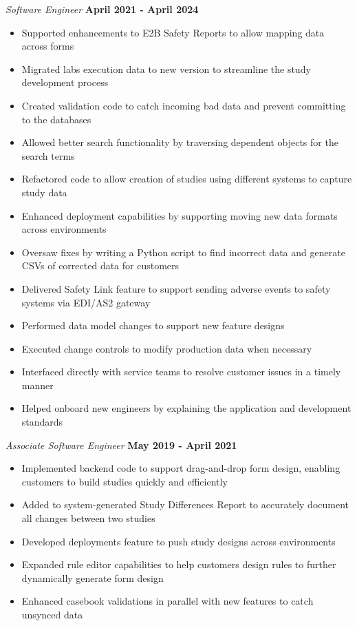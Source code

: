 \documentclass[margin,line]{resume}
\begin{document}
\begin{resume}
\textsl{Software Engineer} \hfill \textbf{April 2021 - April 2024} \vspace{2mm}
\begin{itemize} 
    \item Supported enhancements to E2B Safety Reports to allow mapping data across forms
    \item Migrated labs execution data to new version to streamline the study development process 
    \item Created validation code to catch incoming bad data and prevent committing to the databases 
    \item Allowed better search functionality by traversing dependent objects for the search terms
    \item Refactored code to allow creation of studies using different systems to capture study data
    \item Enhanced deployment capabilities by supporting moving new data formats across environments
    \item Oversaw fixes by writing a Python script to find incorrect data and generate CSVs of corrected data for customers 
    \item Delivered Safety Link feature to support sending adverse events to safety systems via EDI/AS2 gateway
    \item Performed data model changes to support new feature designs
    \item Executed change controls to modify production data when necessary
    \item Interfaced directly with service teams to resolve customer issues in a timely manner
    \item Helped onboard new engineers by explaining the application and development standards
\end{itemize}

\textsl{Associate Software Engineer} \hfill \textbf{May 2019 - April 2021} \vspace{2mm}
\begin{itemize}
    \item Implemented backend code to support drag-and-drop form design, enabling customers to build studies quickly and efficiently
    \item Added to system-generated Study Differences Report to accurately document all changes between two studies
    \item Developed deployments feature to push study designs across environments
    \item Expanded rule editor capabilities to help customers design rules to further dynamically generate form design
    \item Enhanced casebook validations in parallel with new features to catch unsynced data
\end{itemize}


\end{resume}
\end{document}
